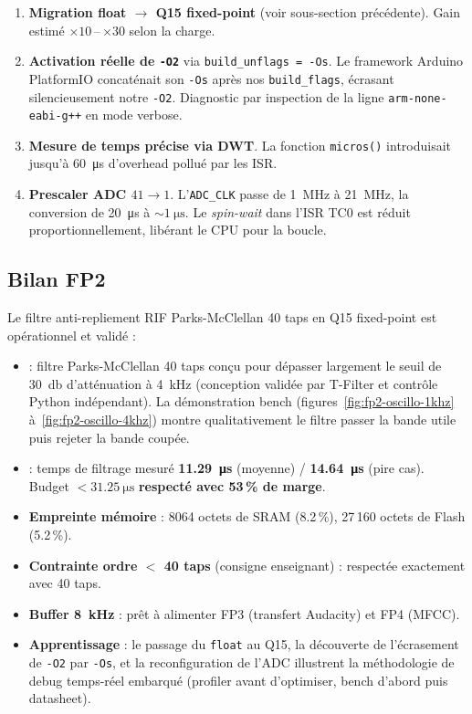 \begin{enumerate}
    \item \textbf{Migration float $\rightarrow$ Q15 fixed-point} (voir sous-section précédente). Gain estimé $\times 10$\,--\,$\times 30$ selon la charge.
    \item \textbf{Activation réelle de \texttt{-O2}} via \verb|build_unflags = -Os|. Le framework Arduino PlatformIO concaténait son \texttt{-Os} après nos \texttt{build\_flags}, écrasant silencieusement notre \texttt{-O2}. Diagnostic par inspection de la ligne \verb|arm-none-eabi-g++| en mode verbose.
    \item \textbf{Mesure de temps précise via DWT}. La fonction \verb|micros()| introduisait jusqu'à \SI{60}{\micro\second} d'overhead pollué par les ISR.
    \item \textbf{Prescaler ADC $41 \rightarrow 1$}. L'\texttt{ADC\_CLK} passe de \SI{1}{\mega\hertz} à \SI{21}{\mega\hertz}, la conversion de \SI{20}{\micro\second} à $\sim \SI{1}{\micro\second}$. Le \emph{spin-wait} dans l'ISR TC0 est réduit proportionnellement, libérant le CPU pour la boucle.
\end{enumerate}

\subsection{Bilan FP2}

Le filtre anti-repliement RIF Parks-McClellan 40 taps en Q15 fixed-point est opérationnel et validé :

\begin{itemize}
    \item \textbf{} : filtre Parks-McClellan 40 taps conçu pour dépasser largement le seuil de \SI{30}{\decibel} d'atténuation à \SI{4}{\kilo\hertz} (conception validée par T-Filter et contrôle Python indépendant). La démonstration bench (figures~\ref{fig:fp2-oscillo-1khz} à~\ref{fig:fp2-oscillo-4khz}) montre qualitativement le filtre passer la bande utile puis rejeter la bande coupée.
    \item \textbf{} : temps de filtrage mesuré \textbf{\SI{11.29}{\micro\second}} (moyenne) / \textbf{\SI{14.64}{\micro\second}} (pire cas). Budget $< \SI{31.25}{\micro\second}$ \textbf{respecté avec 53\,\% de marge}.
    \item \textbf{Empreinte mémoire} : 8064 octets de SRAM (\num{8.2}\,\%), 27\,160 octets de Flash (\num{5.2}\,\%).
    \item \textbf{Contrainte ordre $<$ 40 taps} (consigne enseignant) : respectée exactement avec 40 taps.
    \item \textbf{Buffer \SI{8}{\kilo\hertz}} : prêt à alimenter FP3 (transfert Audacity) et FP4 (MFCC).
    \item \textbf{Apprentissage} : le passage du \texttt{float} au Q15, la découverte de l'écrasement de \texttt{-O2} par \texttt{-Os}, et la reconfiguration de l'ADC illustrent la méthodologie de debug temps-réel embarqué (profiler avant d'optimiser, bench d'abord puis datasheet).
\end{itemize}

\newpage
